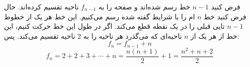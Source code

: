 \p
فرض کنید
$n-1$
خط رسم شده‌اند و صفحه را به
$f_{n-1}$
ناحیه تقسیم کرده‌اند. حال فرض کنید خط
$n$
ام را با شرایط گفته شده رسم می‌کنیم. این خط هر یک از خطوط
$n-1$
تایی قبلی را در یک نقطه قطع می‌کند. اگر در طول این خط حرکت کنیم، این خط از هر یک از
$n$
ناحیه‌ای که می‌گذرد هر ناحیه را به
$2$
ناحیه تقسیم می‌کند. پس:
$$f_n = f_{n-1} + n$$
$$f_n = 2 + 2 + 3 + \cdots + n = \frac{n(n+1)}{2} + 1 = \frac{n^2+n+2}{2}$$
